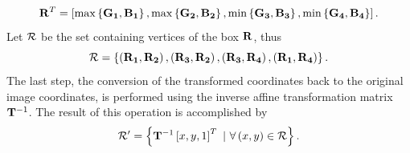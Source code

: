 \begin{equation}
    {\mathbf{R}}^T = \left[ {
        \max \left\{ {\mathbf{G_1}, \mathbf{B_1}} \right\},
        \max \left\{ {\mathbf{G_2}, \mathbf{B_2}} \right\},
        \min \left\{ {\mathbf{G_3}, \mathbf{B_3}} \right\},
        \min \left\{ {\mathbf{G_4}, \mathbf{B_4}} \right\}
    } \right].
\end{equation}
Let $\mathcal{R}$ be the set containing vertices of the box $\mathbf{R}$, thus
\begin{equation}
    \mathcal{R} = \left\{ {
        \left( {\mathbf{R_1}, \mathbf{R_2}} \right),
        \left( {\mathbf{R_3}, \mathbf{R_2}} \right),
        \left( {\mathbf{R_3}, \mathbf{R_4}} \right),
        \left( {\mathbf{R_1}, \mathbf{R_4}} \right)
    } \right\}.
\end{equation}
The last step, the conversion of the transformed coordinates back to the original image coordinates, is performed using the inverse affine transformation matrix $\mathbf{T}^{-1}$. The result of this operation is accomplished by
\begin{equation}
    \mathcal{R'} =
    \left\{ {
        \mathbf{T}^{-1}
        \left[ {x, y, 1} \right]^T
        \ | \
        \forall \left( {x, y} \right) \in \mathcal{R}
    } \right\}.
\end{equation}

